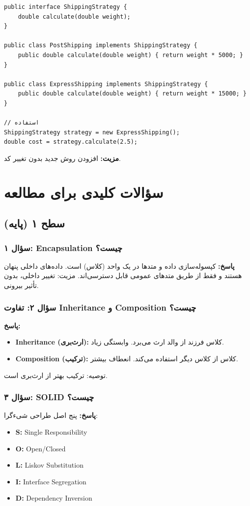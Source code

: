 \documentclass[12pt, a4paper]{article}
\begin{document}
\begin{lstlisting}
public interface ShippingStrategy {
    double calculate(double weight);
}

public class PostShipping implements ShippingStrategy {
    public double calculate(double weight) { return weight * 5000; }
}

public class ExpressShipping implements ShippingStrategy {
    public double calculate(double weight) { return weight * 15000; }
}

// استفاده
ShippingStrategy strategy = new ExpressShipping();
double cost = strategy.calculate(2.5);
\end{lstlisting}

\textbf{مزیت:} افزودن روش جدید بدون تغییر کد.

\section{سؤالات کلیدی برای مطالعه}

\subsection{سطح ۱ (پایه)}

\subsubsection{سؤال ۱: Encapsulation چیست؟}
\textbf{پاسخ:} کپسوله‌سازی داده و متدها در یک واحد (کلاس) است. داده‌های 
داخلی پنهان هستند و فقط از طریق متدهای عمومی قابل دسترسی‌اند. مزیت: تغییر 
داخلی، بدون تأثیر بیرونی.

\subsubsection{سؤال ۲: تفاوت Inheritance و Composition چیست؟}
\textbf{پاسخ:}
\begin{itemize}
    \item \textbf{Inheritance (ارث‌بری):} کلاس فرزند از والد ارث می‌برد. 
وابستگی زیاد.
    \item \textbf{Composition (ترکیب):} کلاس از کلاس دیگر استفاده می‌کند. 
انعطاف بیشتر.
\end{itemize}
توصیه: ترکیب بهتر از ارث‌بری است.

\subsubsection{سؤال ۳: SOLID چیست؟}
\textbf{پاسخ:} پنج اصل طراحی شیءگرا:
\begin{itemize}
    \item \textbf{S:} Single Responsibility
    \item \textbf{O:} Open/Closed
    \item \textbf{L:} Liskov Substitution
    \item \textbf{I:} Interface Segregation
    \item \textbf{D:} Dependency Inversion
\end{itemize}
\end{document}
